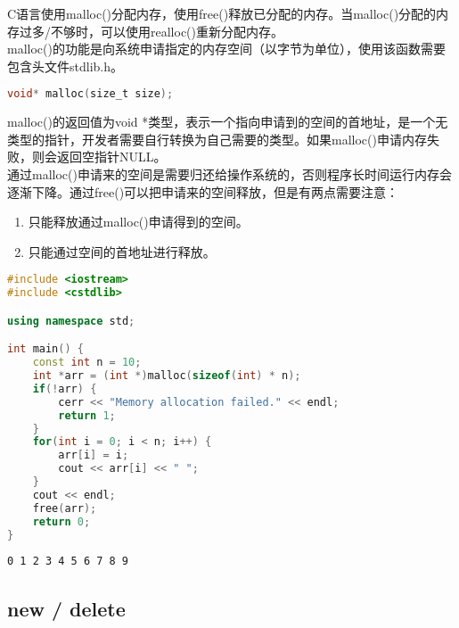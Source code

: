 C语言使用malloc()分配内存，使用free()释放已分配的内存。当malloc()分配的内存过多/不够时，可以使用realloc()重新分配内存。\\

malloc()的功能是向系统申请指定的内存空间（以字节为单位），使用该函数需要包含头文件stdlib.h。

\vspace{-0.5cm}

\begin{lstlisting}[language=C]
void* malloc(size_t size);
\end{lstlisting}

malloc()的返回值为void *类型，表示一个指向申请到的空间的首地址，是一个无类型的指针，开发者需要自行转换为自己需要的类型。如果malloc()申请内存失败，则会返回空指针NULL。\\

通过malloc()申请来的空间是需要归还给操作系统的，否则程序长时间运行内存会逐渐下降。通过free()可以把申请来的空间释放，但是有两点需要注意：

\begin{enumerate}
	\item 只能释放通过malloc()申请得到的空间。
	\item 只能通过空间的首地址进行释放。
\end{enumerate}

\vspace{0.5cm}


\begin{lstlisting}[language=C++]
#include <iostream>
#include <cstdlib>

using namespace std;

int main() {
    const int n = 10;
    int *arr = (int *)malloc(sizeof(int) * n);
    if(!arr) {
        cerr << "Memory allocation failed." << endl;
        return 1;
    }
    for(int i = 0; i < n; i++) {
        arr[i] = i;
        cout << arr[i] << " ";
    }
    cout << endl;
    free(arr);
    return 0;
}
\end{lstlisting}

\begin{tcolorbox}
	\begin{verbatim}
0 1 2 3 4 5 6 7 8 9
	\end{verbatim}
\end{tcolorbox}

\vspace{0.5cm}

\subsection{new / delete}


